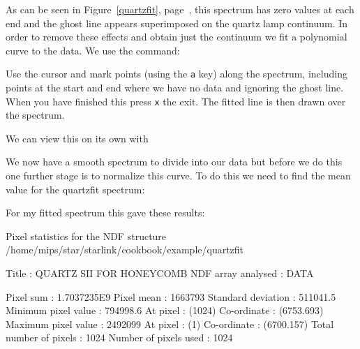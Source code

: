 \documentclass[twoside,11pt]{starlink}
\providecommand{\scspec}[2]{#1}
\begin{document}
As can be seen in \scspec{Figure~\ref{quartzfit},
page~\pageref{quartzfit},}{the figure below,} this spectrum has zero
values at each end and the ghost line appears superimposed on the
quartz lamp continuum. In order to remove these effects and obtain
just the continuum we fit a polynomial curve to the data. We use the
  command:

{\scspec{\small}{ }
\begin{terminalv}
\end{terminalv}
}

Use the cursor and mark points (using the \texttt{a} key) along the
spectrum, including points at the start and end where we have no data
and ignoring the ghost line. When you have finished this press \texttt{x}
the exit. The fitted line is then drawn over the spectrum.



We can view this on its own with

{\scspec{\small}{ }
\begin{terminalv}
\end{terminalv}
}

We now have a smooth spectrum to divide into our data but before we do
this one further stage is to normalize this curve. To do this we need
to find the mean value for the quartzfit spectrum:

{\scspec{\small}{ }
\begin{terminalv}
\end{terminalv}
}

For my fitted spectrum this gave these results:

{\scspec{\small}{ }
\begin{terminalv}
   Pixel statistics for the NDF structure
/home/mips/star/starlink/cookbook/example/quartzfit

      Title                     : QUARTZ SII FOR HONEYCOMB
      NDF array analysed        : DATA

         Pixel sum              : 1.7037235E9
         Pixel mean             : 1663793
         Standard deviation     : 511041.5
         Minimum pixel value    : 794998.6
            At pixel            : (1024)
            Co-ordinate         : (6753.693)
         Maximum pixel value    : 2492099
            At pixel            : (1)
            Co-ordinate         : (6700.157)
         Total number of pixels : 1024
         Number of pixels used  : 1024
\end{terminalv}
}
\end{document}
